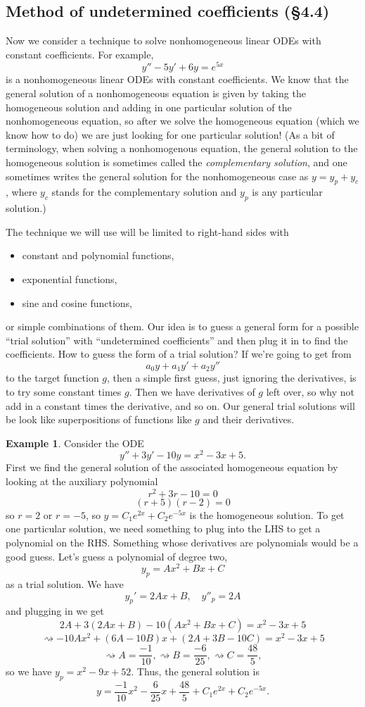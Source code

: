 \documentclass[12pt]{amsart}
\numberwithin{equation}{section}
\theoremstyle{plain} %
\newcommand{\rsa}{\rightsquigarrow}
\theoremstyle{definition}
\newtheorem{ex}[equation]{Example}
\theoremstyle{remark}
\begin{document}
\subsection*{Method of undetermined coefficients (\S4.4)}
Now we consider a technique to solve nonhomogeneous linear ODEs with constant coefficients. For example,
\[ y'' - 5y' + 6y = e^{5x}\]
is a nonhomogeneous linear ODEs with constant coefficients. We know that the general solution of a nonhomogeneous equation is given by taking the homogeneous solution and adding in one particular solution of the nonhomogeneous equation, so after we solve the homogeneous equation (which we know how to do) we are just looking for one particular solution! (As a bit of terminology, when solving a nonhomogenous equation, the general solution to the homogeneous solution is sometimes called the \emph{complementary solution}, and one sometimes writes the general solution for the nonhomogeneous case as $y=y_p + y_c$, where $y_c$ stands for the complementary solution and $y_p$ is any particular solution.)

The technique we will use will be limited to right-hand sides with
\begin{itemize}
\item constant and polynomial functions,
\item exponential functions,
\item sine and cosine functions,
\end{itemize}
or simple combinations of them. Our idea is to guess a general form for a possible ``trial solution'' with ``undetermined coefficients'' and then plug it in to find the coefficients. How to guess the form of a trial solution? If we're going to get from
\[ a_0 y + a_1 y' + a_2 y''\] to the target function $g$, then a simple first guess, just ignoring the derivatives, is to try some constant times $g$. Then we have derivatives of $g$ left over, so why not add in a constant times the derivative, and so on. Our general trial solutions will be look like superpositions of functions like $g$ and their derivatives.


\begin{ex} Consider the ODE
\[ y'' +3y' - 10 y = x^2 - 3x + 5.\]
First we find the general solution of the associated homogeneous equation by looking at the auxiliary polynomial
\[ r^2 + 3r - 10 =0\]
\[ (r + 5)(r-2) = 0\]
so $r=2$ or $r=-5$, so $y= C_1 e^{2x} + C_2 e^{-5x}$ is the homogeneous solution.
To get one particular solution, we need something to plug into the LHS to get a polynomial on the RHS. Something whose derivatives are polynomials would be a good guess. Let's guess a polynomial of degree two,
\[ y_p = A x^2 + B x +  C\]
as a trial solution. We have
\[ y_p' = 2A x + B, \quad y''_p = 2A\]
and plugging in we get
\[ 2A + 3 (2Ax+B) -10 (Ax^2 + Bx+C)  = x^2 -3x +5\]
\[ \rsa -10A x^2 + (6A-10B) x + (2A + 3B -10C)  = x^2 -3x +5\]
\[ \rsa A=\frac{-1}{10}, \rsa B=\frac{-6}{25}, \rsa C= \frac{48}{5},\]
so we have $y_p = x^2 - 9 x + 52$. Thus, the general solution is
\[ y=  \frac{-1}{10}x^2  -\frac{6}{25} x + \frac{48}{5} + C_1 e^{2x} + C_2 e^{-5x}.\]
\end{ex}
\end{document}
